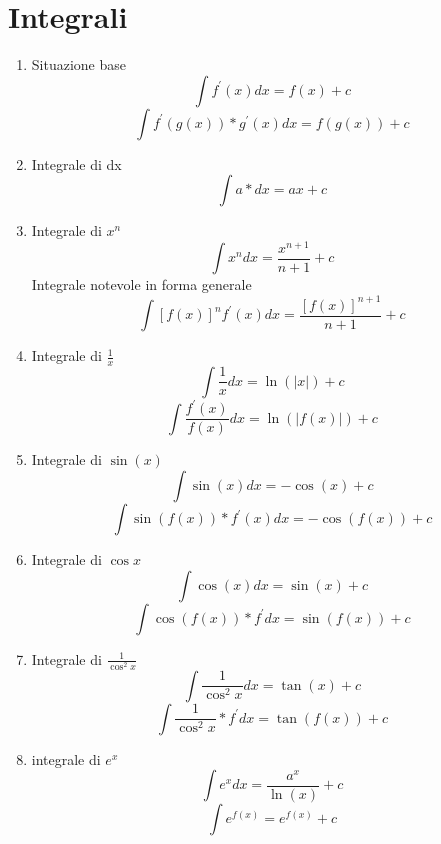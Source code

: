 \documentclass{article}
\newcommand{\abs}[1]{\lvert#1\rvert}
\begin{document}
\section{Integrali}
\begin{enumerate}
\item Situazione base
\begin{equation*}
	\int f^\prime (x)dx=f(x)+c
\end{equation*}
\begin{equation*}
	\int f^\prime(g(x))*g^\prime(x)dx=f(g(x))+c
\end{equation*}
\item Integrale di dx 
\begin{equation*}
	\int a*dx=ax+c
\end{equation*}
\item Integrale di $x^n$ 
\begin{equation*}
	\int x^n dx=\frac{x^{n+1}}{n+1}+c
\end{equation*}
Integrale notevole in forma generale
\begin{equation*}
	\int [f(x)]^nf^\prime (x)dx=\frac{[f(x)]^{n+1}}{n+1}+c
\end{equation*}
\item Integrale di $\frac{1}{x}$
\begin{equation*}
	\int \frac{1}{x}dx=\ln (\abs x)+c
\end{equation*}
\begin{equation*}
	\int \frac{f^\prime(x)}{f(x)}dx=\ln(\abs{f(x)})+c
\end{equation*}
\item Integrale di $\sin(x)$
\begin{equation*}
	\int \sin(x)dx=-\cos (x)+c
\end{equation*}
\begin{equation*}
	\int \sin(f(x))*f^\prime(x)dx=-\cos(f(x))+c
\end{equation*}
\item Integrale di $\cos x$
\begin{equation*}
	\int \cos(x)dx=\sin(x)+c
\end{equation*}
\begin{equation*}
	\int \cos (f(x))*f^\prime dx=\sin(f(x))+c
\end{equation*}
\item Integrale di $\frac{1}{\cos^2 x}$
\begin{equation*}
	\int \frac{1}{\cos^2 x}dx=\tan(x)+c
\end{equation*}
\begin{equation*}
	\int \frac{1}{\cos^2 x}*f^\prime dx=\tan (f(x))+c
\end{equation*}
\item integrale di $e^x$
\begin{equation*}
	\int e^xdx=\frac{a^x}{\ln(x)}+c
\end{equation*}
\begin{equation*}
	\int e^{f(x)}=e^{f(x)}+c
\end{equation*}


\end{enumerate}
\end{document}
